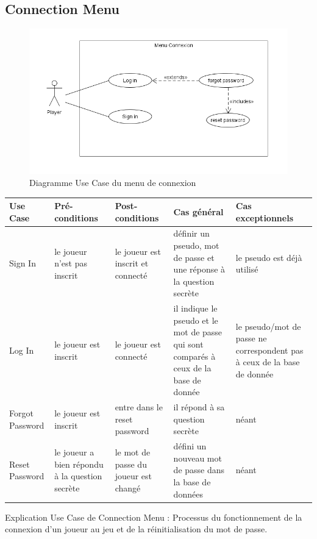 \documentclass[french]{article}
\begin{document}
\subsection{Connection Menu}
\label{Connection menu}
\centering
\begin{figure}[!htbp]
    \centering
    \includegraphics[scale=0.5]{use_case/use_case_connexion.jpg}
    \caption{Diagramme Use Case du menu de connexion}
    \label{use case:connection menu}
\end{figure}

\begin{longtable}{|p{}|p{}|p{}|p{}|p{}|}
\toprule
\rowcolor{lightgray}
\textbf{Use Case} & \textbf{Pré-conditions} & \textbf{Post-conditions}& \textbf{Cas général} & \textbf{Cas exceptionnels}\\
\midrule
  Sign In & le joueur n'est pas inscrit & le joueur est inscrit et connecté & définir un pseudo, mot de passe et une réponse à la question secrète & le pseudo est déjà utilisé\\
  \hline
  Log In & le joueur est inscrit & le joueur est connecté & il indique le pseudo et le mot de passe qui sont comparés à ceux de la base de donnée & le pseudo/mot de passe ne correspondent pas à ceux de la base de donnée\\
  \hline
  Forgot Password & le joueur est inscrit & entre dans le reset password & il répond à sa question secrète & néant\\
  \hline
  Reset Password & le joueur a bien répondu à la question secrète & le mot de passe du joueur est changé & défini un nouveau mot de passe dans la base de données & néant \\
  \bottomrule
\end{longtable}
\begin{center}
Explication Use Case de Connection Menu : Processus du fonctionnement de la connexion d'un joueur au jeu et de la réinitialisation du mot de passe.
\end{center}
\end{document}
